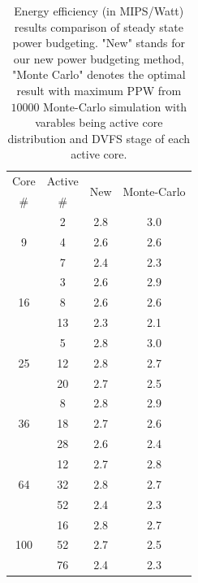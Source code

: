 \begin{table}
  \caption{Energy efficiency (in MIPS/Watt) results comparison of steady state power budgeting. "New" stands for our new power budgeting method, "Monte Carlo" denotes the optimal result with maximum PPW from $10000$ Monte-Carlo simulation with varables being active core distribution and DVFS stage of each active core.}
  \label{tab:PPW_steady}
  \centering
  \begin{tabular}{c|c||c|c}
    \hline
    Core & Active     & \multirow {2}{*}{New} &
                                                    \multirow {2}{*}{Monte-Carlo }\\

\#       &   \#       & &   \\
     \hline
\hline
  \multirow{3}{*}{9} &      2     &       2.8       & 3.0   \\ 
             &      4             &      2.6     &  2.6  \\
             &      7             &       2.4     &  2.3  \\
     \hline
\multirow{3}{*}{16}   &      3    &      2.6     &   2.9 \\   
             &      8             &      2.6    &   2.6  \\
             &      13            &      2.3     &   2.1\\
     \hline
 \multirow{3}{*}{25}  &      5    &     2.8    &   3.0     \\ 
                &     12          &     2.8   &   2.7    \\
                &     20          &     2.7    &   2.5    \\
     \hline
  \multirow{3}{*}{36}  &     8            &      2.8    &  2.9     \\
              &     18            &     2.7          &  2.6   \\
              &     28          &        2.6         &  2.4  \\
     \hline
 \multirow{3}{*}{64}   &     12           &     2.7  &   2.8    \\
              &     32      &      2.8           &   2.7    \\
              &     52        &      2.4          &   2.3     \\
              
 \hline 
 \multirow{3}{*}{100} & 16 & 2.8  &   2.7   \\
                      & 52 & 2.7  &   2.5  \\
                      & 76 & 2.4  &  2.3   \\
\hline
  
\end{tabular}
\end{table}



